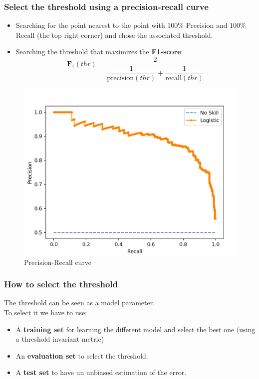 \documentclass[9pt]{beamer}
\begin{document}
\begin{frame}
\frametitle{Select the threshold using a precision-recall curve}
\begin{itemize}
\item<1-> Searching for the point nearest to the point with $100\%$ Precision and $100\%$ Recall (the top right corner) and chose the associated threshold.
\item<2->  Searching the threshold that maximizes the \textbf{F1-score}:
$$
\textbf{F}_1(thr) = \dfrac{2}{\dfrac{1}{\mbox{precision}(thr)}+ \dfrac{1}{\mbox{recall}(thr)}}
$$
\end{itemize}
\vspace{2mm}
\begin{figure}[ht]
\includegraphics[scale=0.25]{images/precision-recall.png}
\caption{Precision-Recall curve}
\end{figure}
\end{frame}
\begin{frame}
\frametitle{How to select the threshold}
The threshold can be seen as a model parameter.\\
To select it we have to use:
\begin{itemize}
\item<1->  A \textbf{training set} for learning the different model and select the best one (using a threshold invariant metric)
\item<2->  An \textbf{evaluation set} to select the threshold.
\item<3->  A \textbf{test set} to have un unbiased estimation of the error.
\end{itemize}
\end{frame}
\end{document}
